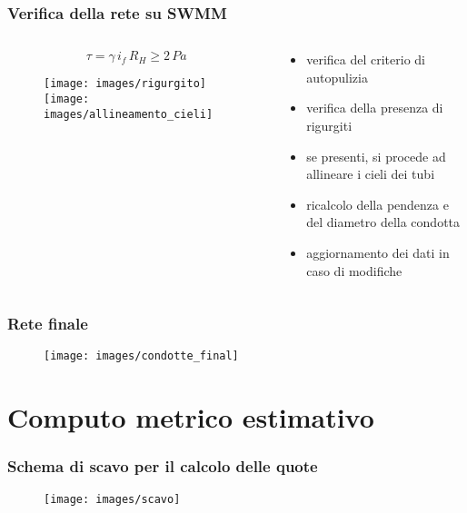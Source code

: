 \documentclass{beamer}
\newcommand{\nologo}{\setbeamertemplate{logo}{}}
\begin{document}
\begin{frame}
 \frametitle{Verifica della rete su SWMM}
 
 \begin{columns}
  \begin{column}{.5\textwidth}
	  \begin{center}
		  \begin{overprint}
	  \begin{equation*}
	              \tau = \gamma\,i_f\,R_H \geq 2\,Pa
	             \end{equation*}
			 \end{overprint}
			 \end{center}
  \begin{figure}
   \centering
   \begin{overprint}
     \texttt{[image: images/rigurgito]}
     \texttt{[image: images/allineamento\_cieli]}
   \end{overprint}
  \end{figure}   
  \end{column}
  
  \begin{column}{.5\textwidth}
   \begin{itemize}
    \item verifica del criterio di autopulizia
    \item verifica della presenza di rigurgiti
    \item se presenti, si procede ad allineare i cieli dei tubi
    \item ricalcolo della pendenza e del diametro della condotta
   \item aggiornamento dei dati in caso di modifiche
   \end{itemize}
  \end{column}
 \end{columns}
\end{frame}

{\nologo
\begin{frame}
 \frametitle{Rete finale}
 \begin{figure}
  \centering
  \texttt{[image: images/condotte\_final]}
 \end{figure} 
\end{frame}
}

\section{Computo metrico estimativo}
{\nologo
\begin{frame}
 \frametitle{Schema di scavo per il calcolo delle  quote}
 \begin{figure}
  \centering
  \texttt{[image: images/scavo]}
 \end{figure}
\end{frame}
}
\end{document}
